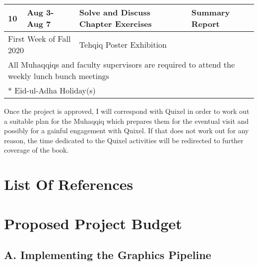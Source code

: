 \documentclass{article}
\begin{document}
\begin{tabularx}{\textwidth}{|*{2}{l|}X|l|}
  10                                           & Aug 3- Aug 7                                   & Solve and Discuss Chapter Exercises                                    & Summary Report         \\\hline
  \multicolumn{2}{|l}{First Week of Fall 2020} & \multicolumn{2}{|l|}{Tehqiq Poster Exhibition}                                                                                                   \\\hline
  \multicolumn{4}{l}{\footnotesize * All Muhaqqiqs and faculty supervisors are required to attend the weekly lunch bunch meetings}                                                                \\
  \multicolumn{4}{l}{\footnotesize ** Eid-ul-Adha Holiday(s)}
\end{tabularx}

Once the project is approved, I will correspond with Quixel in order to work out a suitable plan for the Muhaqqiq which prepares them for the eventual visit and possibly for a gainful engagement with Quixel. If that does not work out for any reason, the time dedicated to the Quixel activities will be redirected to further coverage of the book.

\newpage

\section{List Of References}



\printbibliography[heading=none]

\newpage

\section{Proposed Project Budget}


\subsection*{A. Implementing the Graphics Pipeline}
\end{document}
